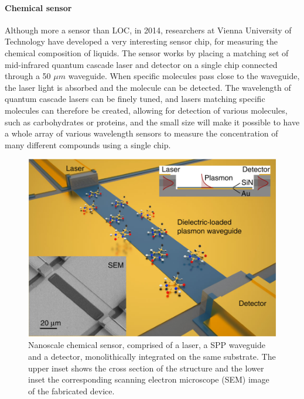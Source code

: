 \paragraph{Chemical sensor \cite{Schwarz2014}}
Although more a sensor than LOC, in 2014, researchers at Vienna University of Technology have developed a very interesting sensor chip, for measuring the chemical composition of liquids. The sensor works by placing a matching set of mid-infrared quantum cascade laser and detector on a single chip connected through a 50 $\mu m$ waveguide. When specific molecules pass close to the waveguide, the laser light is absorbed and the molecule can be detected. The wavelength of quantum cascade lasers can be finely tuned, and lasers matching specific molecules can therefore be created, allowing for detection of various molecules, such as carbohydrates or proteins, and the small size will make it possible to have a whole array of various wavelength sensors to measure the concentration of many different compounds using a single chip.
\begin{figure}[htb]
	\centering
	\includegraphics[width=\textwidth]{figures/mlh/laserchip.jpg}
	\caption{Nanoscale chemical sensor, comprised of a laser, a SPP waveguide and a detector, monolithically integrated on the same substrate. The upper inset shows the cross section of the structure and the lower inset the corresponding scanning electron microscope (SEM) image of the fabricated device.\cite{Schwarz2014}}
	\label{fig:laserchip}
\end{figure}

